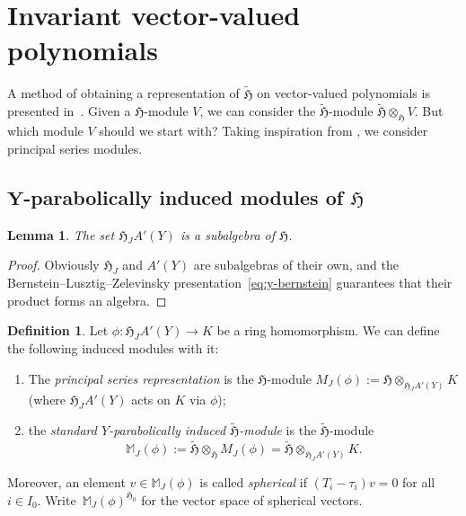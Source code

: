 \documentclass[pdftex]{sigma}
\newtheorem{Lemma}[Theorem]{Lemma}
\theoremstyle{definition}
\newtheorem{Definition}[Theorem]{Definition}
\numberwithin{equation}{section}
\begin{document}
\section{Invariant vector-valued polynomials}\label{sec:jasper}
A method of obtaining a representation of $\tilde{\mathfrak{H}}$ on
vector-valued polynomials is presented in~\cite{cherednikInduced}. Given a
$\mathfrak{H}$-module $V$, we can consider the $\tilde{\mathfrak{H}}$-module
$\tilde{\mathfrak{H}}\otimes_{\mathfrak{H}}V$. But which module $V$ should
we start with? Taking inspiration from \cite[Section~3]{stokmanInduced},
we consider principal series modules.

\subsection[Y-parabolically induced modules of H]{$\boldsymbol{ Y}$-parabolically induced modules of $\boldsymbol{\mathfrak{H}}$}
\label{sec:parabolically-induced}
\begin{Lemma}
 The set $\mathfrak{H}_J A'(Y)$ is a subalgebra of $\mathfrak{H}$.
\end{Lemma}
\begin{proof}
 Obviously $\mathfrak{H}_J$ and $A'(Y)$ are subalgebras of their own, and
 the Bernstein--Lusztig--Zelevinsky presentation~\eqref{eq:y-bernstein}
guarantees that their product forms an algebra.
\end{proof}

\begin{Definition}
 Let $\phi\colon \mathfrak{H}_J A'(Y)\to K$ be a ring homomorphism.
 We can define the following induced modules with it:
 \begin{enumerate}\itemsep=0pt
 \item[(i)] The \emph{principal series representation} is
 the $\mathfrak{H}$-module
$
 M_J(\phi) \!\!:=\! \mathfrak{H} \otimes_{\mathfrak{H}_JA'(Y)}\! K
$
(where $\mathfrak{H}_JA'(Y)$ acts on $K$ via $\phi$);
\item[(ii)] the \emph{standard $Y$-parabolically induced $\tilde{\mathfrak{H}}$-module} is the $\tilde{\mathfrak{H}}$-module
 \[
 \mathbb{M}_J(\phi) := \tilde{\mathfrak{H}}\otimes_{\mathfrak{H}}
 M_J(\phi) = \tilde{\mathfrak{H}}\otimes_{\mathfrak{H}_JA'(Y)} K.
 \]
 \end{enumerate}
 Moreover, an element $v\in\mathbb{M}_J(\phi)$ is called \emph{spherical} if
 $(T_i-\tau_i) v = 0$ for all $i\in I_0$. Write~$\mathbb{M}_J(\phi)^{\mathfrak{H}_0}$ for the vector space of spherical
 vectors.
\end{Definition}
\end{document}
